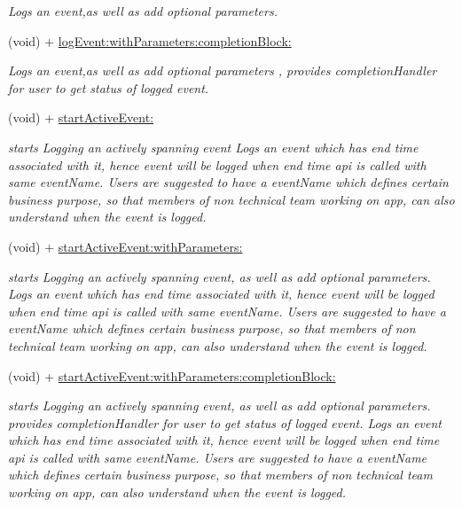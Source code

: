 \begin{DoxyCompactItemize}
\begin{DoxyCompactList}\small\item\em Logs an event,as well as add optional parameters. \end{DoxyCompactList}\item 
(void) + \hyperlink{interface_n_f_logger_a92e20244e4fd66dca9596a9e758cc6a1}{log\+Event\+:with\+Parameters\+:completion\+Block\+:}
\begin{DoxyCompactList}\small\item\em Logs an event,as well as add optional parameters , provides completion\+Handler for user to get status of logged event. \end{DoxyCompactList}\item 
(void) + \hyperlink{interface_n_f_logger_a2d98749d91d892500fab101747d06a71}{start\+Active\+Event\+:}
\begin{DoxyCompactList}\small\item\em starts Logging an actively spanning event Logs an event which has end time associated with it, hence event will be logged when end time api is called with same event\+Name. Users are suggested to have a event\+Name which defines certain business purpose, so that members of non technical team working on app, can also understand when the event is logged. \end{DoxyCompactList}\item 
(void) + \hyperlink{interface_n_f_logger_a415def4182d5d458ff013bacb1320857}{start\+Active\+Event\+:with\+Parameters\+:}
\begin{DoxyCompactList}\small\item\em starts Logging an actively spanning event, as well as add optional parameters. Logs an event which has end time associated with it, hence event will be logged when end time api is called with same event\+Name. Users are suggested to have a event\+Name which defines certain business purpose, so that members of non technical team working on app, can also understand when the event is logged. \end{DoxyCompactList}\item 
(void) + \hyperlink{interface_n_f_logger_a943cd3b2d89a9b40f9bb2540d8fcd190}{start\+Active\+Event\+:with\+Parameters\+:completion\+Block\+:}
\begin{DoxyCompactList}\small\item\em starts Logging an actively spanning event, as well as add optional parameters. provides completion\+Handler for user to get status of logged event. Logs an event which has end time associated with it, hence event will be logged when end time api is called with same event\+Name. Users are suggested to have a event\+Name which defines certain business purpose, so that members of non technical team working on app, can also understand when the event is logged. \end{DoxyCompactList}\item 

\end{DoxyCompactItemize}
